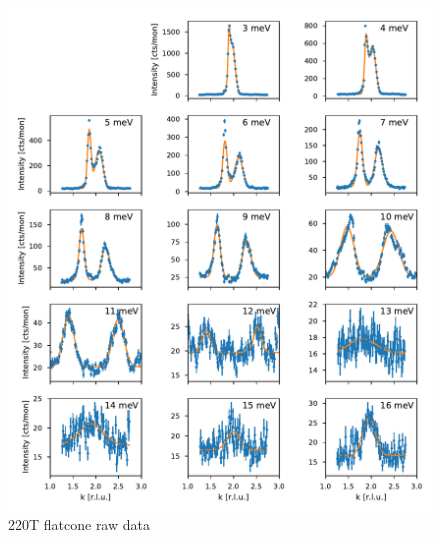 \begin{figure}
    \centering
    \includegraphics[width=\textwidth]{fig/lowen/fits_220T.pdf}
    \caption[220T flatcone raw data]{220T flatcone raw data}
    \label{fig:flatcone_phonons_400T_raw}    
\end{figure}

